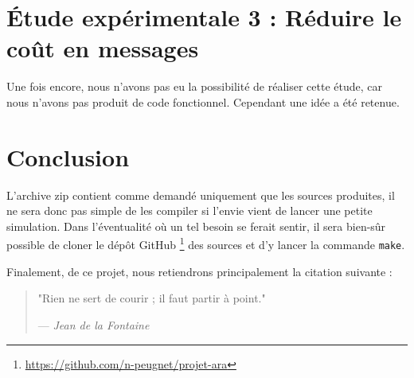 \documentclass[french]{article}
\begin{document}
\section{Étude expérimentale 3 : Réduire le coût en messages}

Une fois encore, nous n'avons pas eu la possibilité de réaliser cette étude, car nous n'avons pas produit de code fonctionnel.
Cependant une idée a été retenue.

\section*{Conclusion}

L'archive zip contient comme demandé uniquement que les sources produites, il ne sera donc pas simple de les compiler si l'envie vient de lancer une petite simulation.
Dans l'éventualité où un tel besoin se ferait sentir, il sera bien-sûr possible de cloner le dépôt GitHub
\footnote{\url{https://github.com/n-peugnet/projet-ara}}
des sources et d'y lancer la commande \lstinline{make}.

Finalement, de ce projet, nous retiendrons principalement la citation suivante :

\begin{quotation}
	"Rien ne sert de courir ; il faut partir à point."

	--- \emph{Jean de la Fontaine}
\end{quotation}
\end{document}
